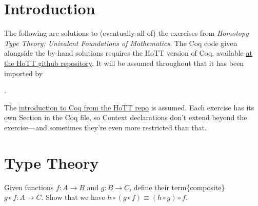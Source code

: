 \begin{coqdoccode}
\end{coqdoccode}


\section*{Introduction}


The following are solutions to (eventually all of) the exercises from
\textit{Homotopy Type Theory: Univalent Foundations of Mathematics}.  The Coq
code given alongside the by-hand solutions requires the HoTT version of Coq,
available \href{https://github.com/HoTT}{at the HoTT github repository}.  It
will be assumed throughout that it has been imported by \begin{coqdoccode}
\coqdocemptyline
\coqdocnoindent
{}  .\coqdoceol
\coqdocemptyline
\end{coqdoccode}


The
\href{https://github.com/HoTT/book/blob/master/coq_introduction/Reading_HoTT_in_Coq.v}{introduction to Coq from the HoTT repo} 
is assumed.  Each exercise has its own Section in
the Coq file, so Context declarations don't extend beyond the exercise---and sometimes they're even more restricted than that.


\section{Type Theory}




Given functions $f:A\to B$ and $g:B\to C$, define their term\{composite\} $g
\circ f : A \to C$.  Show that we have $h \circ (g \circ f) \equiv (h \circ g)
\circ f$.


